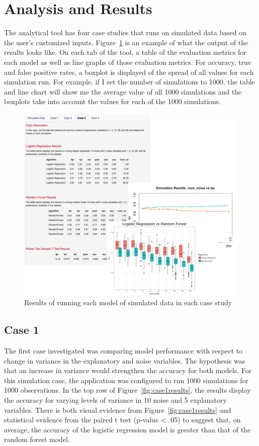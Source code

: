 \documentclass{llncs}
\begin{document}
\section{Analysis and Results}
\noindent 
The analytical tool has four case studies that runs on simulated data based on the user's customized inputs. Figure~\ref{fig:center-content} is an example of what the output of the results looks like.  On each tab of the tool, a table of the evaluation metrics for each model as well as line graphs of those evaluation metrics.  For accuracy, true and false positive rates, a boxplot is displayed of the spread of all values for each simulation run.  For example, if I set the number of simulations to 1000, the table and line chart will show me the average value of all 1000 simulations and the boxplots take into account the  values for each of the 1000 simulations.

\begin{figure}
\centering
\includegraphics[scale=0.75]{center-content.png}
\caption{Results of running each model of simulated data in each case study}
\label{fig:center-content}
\end{figure}

\subsection{Case 1}
\noindent 
The first case investigated was comparing model performance with respect to change in variance in the explanatory and noise variables. The hypothesis was that an increase in variance would strengthen the accuracy for both models. For this simulation case, the application was configured to run 1000 simulations for 1000 observations. In the top row of Figure~\ref{fig:case1results}, the results display the accuracy for varying levels of variance in 10 noise and 5 explanatory variables. There is both visual evidence from Figure~\ref{fig:case1results} and statistical evidence  from the paired t test (p-value < .05) to suggest that, on average, the accuracy of the logistic regression model is  greater than that of the random forest model. 
\end{document}
